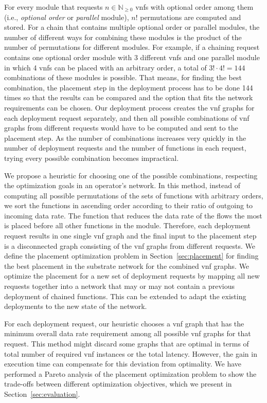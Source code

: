 \documentclass[10pt,a4paper,conference]{IEEEtran}
\begin{document}
For every module that requests $ n {\in} \mathbb{N}_{\geq0} $ \acp{vnf} with 
optional order among them (i.e., \emph{optional order} or \emph{parallel} module), 
$ n! $ permutations are computed and stored. For a 
chain that contains multiple optional order or parallel modules, the number of 
different ways for combining these modules is the product of the number of 
permutations for different modules. For example, if a chaining request contains 
one optional order module with 3 different \acp{vnf} and one parallel module in which 
4 \acp{vnf} can be placed with an arbitrary order, a total of $ 3! {\cdot} 4! {=} 144 $ 
combinations of these modules is possible. That means, for finding the best combination,
the placement step in the deployment process has to be done 144 times so that the 
results can be compared and the option that fits the network requirements can be
chosen. Our deployment process creates the \ac{vnf} graphs for each deployment 
request separately, and then all possible combinations of \ac{vnf} graphs from 
different requests would have to be computed and sent to the placement step. As the number 
of combinations increases very quickly in the number of deployment requests and  
the number of functions in each request, trying every possible combination
becomes impractical. 

We propose a heuristic for choosing one of the possible combinations, respecting
the optimization goals in an operator's network. In this method, instead of computing
all possible permutations of the sets of functions with arbitrary orders, we 
sort the functions in ascending order according to their ratio of outgoing to
incoming data rate. The function that reduces the data rate of the flows the most 
is placed before all other functions in the module. Therefore, each deployment 
request results in one single \ac{vnf} graph and the final input to the placement
step is a disconnected graph consisting of the \ac{vnf} graphs from different requests.
We define the placement optimization problem in Section~\ref{sec:placement} for 
finding the best placement in the substrate network for the combined \ac{vnf} graphs.
We optimize the placement for a new set of deployment requests by mapping all new 
requests together into a network that may or may not contain a previous deployment of chained 
functions. This can be extended to adapt the existing deployments to the new 
state of the network.

For each deployment request, our heuristic chooses a \ac{vnf} graph that has the 
minimum overall data rate requirement among all possible \ac{vnf} graphs for that
request.
This method might discard some graphs that are optimal 
in terms of total number of required \ac{vnf} instances or the total latency. However,
the gain in execution time can compensate for this deviation from optimality.
We have performed a Pareto analysis of the placement optimization problem to show
the trade-offs between different optimization objectives, which we present in 
Section~\ref{sec:evaluation}.
\end{document}
